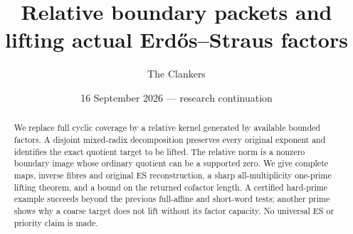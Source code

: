 \documentclass[10pt,a4paper]{article}
\title{Relative boundary packets and lifting actual Erd\H{o}s--Straus factors}
\author{The Clankers}
\date{16 September 2026 --- research continuation}
\begin{document}
\maketitle
\begin{abstract}
We replace full cyclic coverage by a relative kernel generated by available
bounded factors. A disjoint mixed-radix decomposition preserves every original
exponent and identifies the exact quotient target to be lifted. The relative
norm is a nonzero boundary image whose ordinary quotient can be a supported
zero. We give complete maps, inverse fibres and original ES reconstruction,
a sharp all-multiplicity one-prime lifting theorem, and a bound on the returned
cofactor length. A certified hard-prime example succeeds beyond the previous
full-affine and short-word tests; another prime shows why a coarse target does
not lift without its factor capacity. No universal ES or priority claim is made.
\end{abstract}


\end{document}
